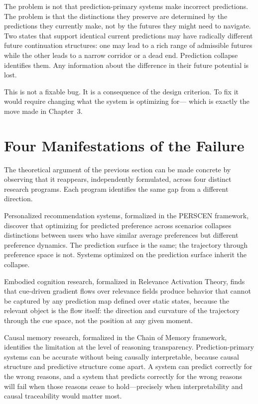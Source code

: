 \documentclass[12pt, oneside]{book}
\theoremstyle{flyxion}
\theoremstyle{definition}
\begin{document}
The problem is not that prediction-primary systems make incorrect
predictions. The problem is that the distinctions they preserve are
determined by the predictions they currently make, not by the futures
they might need to navigate. Two states that support identical current
predictions may have radically different future continuation structures:
one may lead to a rich range of admissible futures while the other
leads to a narrow corridor or a dead end. Prediction collapse identifies
them. Any information about the difference in their future potential is
lost.

This is not a fixable bug. It is a consequence of the design criterion.
To fix it would require changing what the system is optimizing for---
which is exactly the move made in Chapter~3.

\section{Four Manifestations of the Failure}

The theoretical argument of the previous section can be made concrete
by observing that it reappears, independently formulated, across four
distinct research programs. Each program identifies the same gap from
a different direction.

Personalized recommendation systems, formalized in the PERSCEN
framework, discover that optimizing for predicted preference across
scenarios collapses distinctions between users who have similar average
preferences but different preference dynamics. The prediction surface
is the same; the trajectory through preference space is not. Systems
optimized on the prediction surface inherit the collapse.

Embodied cognition research, formalized in Relevance Activation Theory,
finds that cue-driven gradient flows over relevance fields produce
behavior that cannot be captured by any prediction map defined over
static states, because the relevant object is the flow itself: the
direction and curvature of the trajectory through the cue space, not
the position at any given moment.

Causal memory research, formalized in the Chain of Memory framework,
identifies the limitation at the level of reasoning transparency.
Prediction-primary systems can be accurate without being causally
interpretable, because causal structure and predictive structure come
apart. A system can predict correctly for the wrong reasons, and a
system that predicts correctly for the wrong reasons will fail when
those reasons cease to hold---precisely when interpretability and causal
traceability would matter most.
\end{document}
